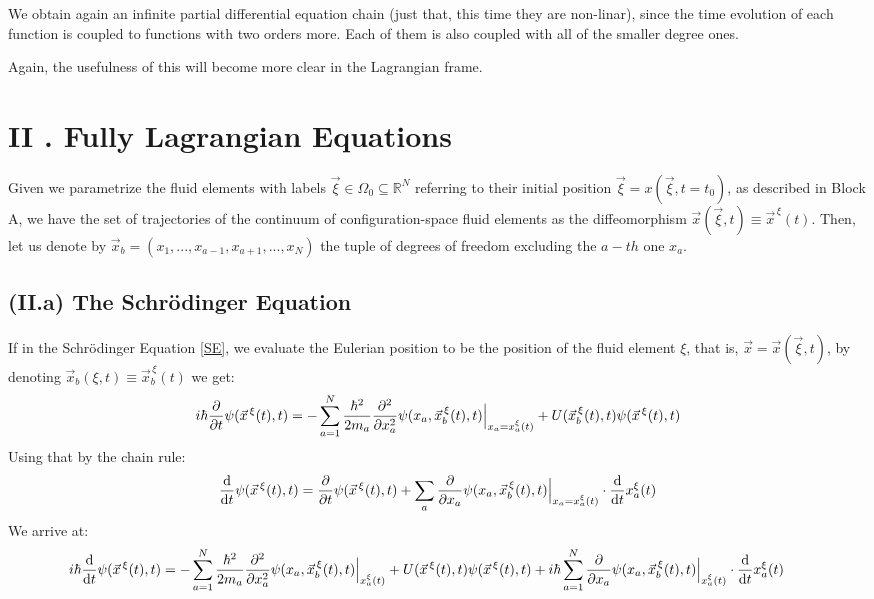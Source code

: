 \documentclass[11pt, a4paper]{article} %
\newcommand{\R}{\mathbb{R}} %
\begin{document}
We obtain again an infinite partial differential equation chain (just that, this time they are non-linar), since the time evolution of each function is coupled to functions with two orders more. Each of them is also coupled with all of the smaller degree ones.

Again, the usefulness of this will become more clear in the Lagrangian frame.

\newpage
{}
\section*{II . Fully Lagrangian Equations}\vspace{-0.3cm}
Given we parametrize the fluid elements with labels $\vec{\xi}\in\Omega_0\subseteq\R^N$ referring to their initial position $\vec{\xi}=x(\vec{\xi},t=t_0)$, as described in Block A, we have the set of trajectories of the continuum of configuration-space fluid elements as the diffeomorphism $\vec{x}(\vec{\xi},t) \equiv \vec{x}^{\, \xi}(t)$.
Then, let us denote by $\vec{x}_b=(x_1,...,x_{a-1}, x_{a+1},...,x_N)$ the tuple of degrees of freedom excluding the $a-th$ one $x_a$.\vspace{-0.3cm}
\subsection*{(II.a) The Schrödinger Equation}\vspace{-0.2cm}
If in the Schrödinger Equation \eqref{SE}, we evaluate the Eulerian position to be the position of the fluid element $\xi$, that is, $\vec{x}=\vec{x}(\vec{\xi},t)$, by denoting $\vec{x}_b(\xi,t)\equiv \vec{x}_b^{\, \xi}(t)$ we get:
\begin{equation}
i\hbar \pdv{}{t}\psi(\vec{x}^{\, \xi}(t),t)=-\sum_{a=1}^N \frac{\hbar^2}{2m_a}\pdv[2]{}{x_a}\psi(x_a, \vec{x}_b^{\, \xi}(t),t)\Big\rvert_{x_a=x^\xi_a(t)}+U(\vec{x}_b^{\, \xi}(t),t)\psi(\vec{x}^{\, \xi}(t),t)
\end{equation}
Using that by the chain rule:
\begin{equation}
\dv{}{t}\psi(\vec{x}^{\, \xi}(t), t)=\pdv{}{t}\psi(\vec{x}^{\, \xi}(t), t)+\sum_a \pdv{}{x_a}\psi(x_a,\vec{x}_b^{\, \xi}(t), t)\Big\rvert_{x_a=x^\xi_a(t)}\cdot \dv{}{t}x^\xi_a(t)
\end{equation}
We arrive at:\vspace{-0.1cm}
\begin{equation}\label{KinAdv}
\hspace*{-0.6cm} i\hbar \dv{}{t}\psi(\vec{x}^{\, \xi}(t),t)=-\sum_{a=1}^N \frac{\hbar^2}{2m_a}\pdv[2]{}{x_a}\psi(x_a, \vec{x}_b^{\, \xi}(t),t)\Big\rvert_{x^\xi_a(t)}+U(\vec{x}^{\, \xi}(t),t)\psi(\vec{x}^{\, \xi}(t),t)+i\hbar \sum_{a=1}^N  \pdv{}{x_a}\psi(x_a,\vec{x}_b^{\, \xi}(t), t)\Big\rvert_{x^\xi_a(t)}\cdot \dv{}{t}x^\xi_a(t)
\end{equation}
\end{document}
